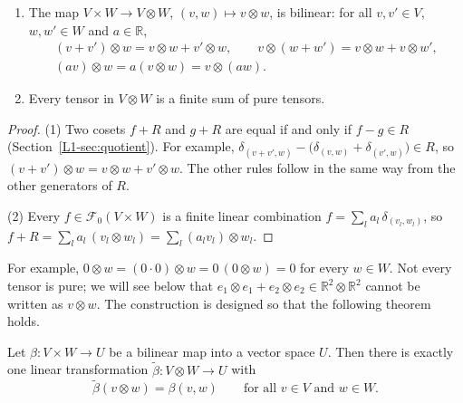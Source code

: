 \begin{proposition}\label{L1-prop:tensor-basic}
    \begin{enumerate}
        \item The map $V \times W \to V \otimes W$, $(v, w) \mapsto v \otimes w$, is bilinear: for all $v, v' \in V$, $w, w' \in W$ and $a \in \mathbb{R}$,
        \begin{gather*}
            (v + v') \otimes w = v \otimes w + v' \otimes w, \qquad v \otimes (w + w') = v \otimes w + v \otimes w', \\
            (av) \otimes w = a(v \otimes w) = v \otimes (aw).
        \end{gather*}
        \item Every tensor in $V \otimes W$ is a finite sum of pure tensors.
    \end{enumerate}
\end{proposition}

\begin{proof}
    (1) Two cosets $f + R$ and $g + R$ are equal if and only if $f - g \in R$ (Section~\ref{L1-sec:quotient}). For example, $\delta_{(v + v', w)} - \big(\delta_{(v, w)} + \delta_{(v', w)}\big) \in R$, so $(v + v') \otimes w = v \otimes w + v' \otimes w$. The other rules follow in the same way from the other generators of $R$.

    (2) Every $f \in \mathcal{F}_0(V \times W)$ is a finite linear combination $f = \sum_l a_l\,\delta_{(v_l, w_l)}$, so $f + R = \sum_l a_l\,(v_l \otimes w_l) = \sum_l (a_lv_l) \otimes w_l$.
\end{proof}

For example, $0 \otimes w = (0 \cdot 0) \otimes w = 0\,(0 \otimes w) = 0$ for every $w \in W$. Not every tensor is pure; we will see below that $e_1 \otimes e_1 + e_2 \otimes e_2 \in \mathbb{R}^2 \otimes \mathbb{R}^2$ cannot be written as $v \otimes w$. The construction is designed so that the following theorem holds.

\begin{theorem}\label{L1-thm:universal}
    Let $\beta: V \times W \to U$ be a bilinear map into a vector space $U$. Then there is exactly one linear transformation $\tilde\beta: V \otimes W \to U$ with
    \[\tilde\beta(v \otimes w) = \beta(v, w) \qquad \text{for all } v \in V \text{ and } w \in W.\]
\end{theorem}

